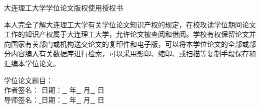 \begin{center}
     {\heiti\Large 大连理工大学学位论文版权使用授权书}
\end{center}

本人完全了解大连理工大学有关学位论文知识产权的规定，在校攻读学位期间论文工作的知识产权属于大连理工大学，允许论文被查阅和借阅。学校有权保留论文并向国家有关部门或机构送交论文的复印件和电子版，可以将本学位论文的全部或部分内容编入有关数据库进行检索，可以采用影印、缩印、或扫描等复制手段保存和汇编本学位论文。\\\newline

学位论文题目：\uline{\hfill {\titleCh} \hfill}  \\

\vspace{1pt}
作者签名：\uline{\hfill \hfill} 日期：\uline{\, {\approveYear} \,} 年\uline{\, {\approveMonth} \,} 月\uline{\, {\approveDay} \,} 日 \\

\vspace{1pt}
导师签名：\uline{\hfill {} \hfill} 日期：\uline{\, {\approveYear} \,} 年\uline{\, {\approveMonth} \,} 月\uline{\, {\approveDay} \,} 日   \\ %



\vspace{60pt}

\clearpage  %
\null
\clearpage



